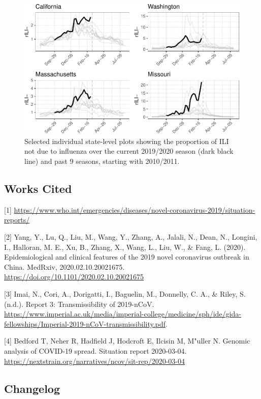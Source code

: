 \documentclass[]{article}
\begin{document}
\begin{figure}
\centering
\includegraphics{ili-labtest-report_files/figure-latex/get-sd-data-1.pdf}
\caption{Selected individual state-level plots showing the proportion of
ILI not due to influenza over the current 2019/2020 season (dark black
line) and past 9 seasons, starting with 2010/2011.}
\end{figure}

\hypertarget{works-cited}{%
\subsection{Works Cited}\label{works-cited}}

{[}1{]}
\url{https://www.who.int/emergencies/diseases/novel-coronavirus-2019/situation-reports/}

{[}2{]} Yang, Y., Lu, Q., Liu, M., Wang, Y., Zhang, A., Jalali, N.,
Dean, N., Longini, I., Halloran, M. E., Xu, B., Zhang, X., Wang, L.,
Liu, W., \& Fang, L. (2020). Epidemiological and clinical features of
the 2019 novel coronavirus outbreak in China. MedRxiv,
2020.02.10.20021675. \url{https://doi.org/10.1101/2020.02.10.20021675}

{[}3{]} Imai, N., Cori, A., Dorigatti, I., Baguelin, M., Donnelly, C.
A., \& Riley, S. (n.d.). Report 3: Transmissibility of 2019-nCoV.
\url{https://www.imperial.ac.uk/media/imperial-college/medicine/sph/ide/gida-fellowships/Imperial-2019-nCoV-transmissibility.pdf}.

{[}4{]} Bedford T, Neher R, Hadfield J, Hodcroft E, Ilcisin M, M"uller
N. Genomic analysis of COVID-19 spread. Situation report 2020-03-04.
\url{https://nextstrain.org/narratives/ncov/sit-rep/2020-03-04}

\hypertarget{changelog}{%
\subsection{Changelog}\label{changelog}}
\end{document}
